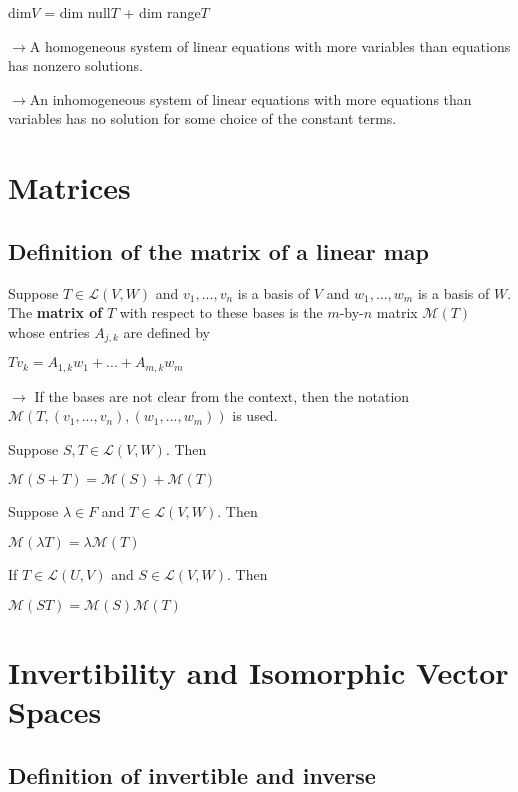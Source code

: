 \documentclass{article}
\begin{document}
\centerline{dim$V$ = dim null$T$ + dim range$T$}

\vspace{20pt}

$\rightarrow$A homogeneous system of linear equations with more variables than equations has nonzero solutions.

$\rightarrow$An inhomogeneous system of linear equations with more equations than variables has no solution for some choice of the constant terms.

\newpage

\section{Matrices}
\subsection{Definition of the matrix of a linear map}

Suppose $T \in \mathcal{L}(V,W)$ and $v_1,...,v_n$ is a basis of $V$ and $w_1,...,w_m$ is a basis of $W$. The \textbf{matrix of} $T$ with respect to these bases is the $m$-by-$n$ matrix $\mathcal{M}(T)$ whose entries $A_{j,k}$ are defined by
\vspace{4pt}

\centerline{$Tv_k = A_{1,k}w_1+...+A_{m,k}w_m$}
\vspace{10pt}

$\rightarrow$ If the bases are not clear from the context, then the notation $\mathcal{M}(T,(v_1,...,v_n),(w_1,...,w_m))$ is used.
\vspace{10pt}

Suppose $S,T \in \mathcal{L}(V,W)$. Then

\centerline{$\mathcal{M}(S+T) = \mathcal{M}(S) + \mathcal{M}(T)$}

Suppose $\lambda \in F$ and $T\in\mathcal{L}(V,W)$. Then

\centerline{$\mathcal{M}(\lambda T) = \lambda\mathcal{M}(T)$}

If $T\in\mathcal{L}(U,V)$ and $S\in\mathcal{L}(V,W)$. Then

\centerline{$\mathcal{M}(ST)=\mathcal{M}(S)\mathcal{M}(T)$}

\section{Invertibility and Isomorphic Vector Spaces}
\subsection{Definition of invertible and inverse}
\end{document}
